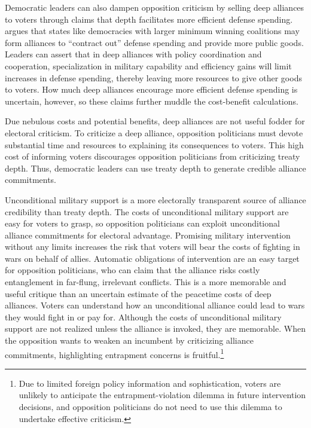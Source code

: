 \documentclass[12pt]{article}
\begin{document}
Democratic leaders can also dampen opposition criticism by selling deep alliances to voters through claims that depth facilitates more efficient defense spending. 
\citet{Kimball2010} argues that states like democracies with larger minimum winning coalitions may form alliances to ``contract out'' defense spending and provide more public goods. 
Leaders can assert that in deep alliances with policy coordination and cooperation, specialization in military capability and efficiency gains will limit increases in defense spending, thereby leaving more resources to give other goods to voters.  
How much deep alliances encourage more efficient defense spending is uncertain, however, so these claims further muddle the cost-benefit calculations. 


Due nebulous costs and potential benefits, deep alliances are not useful fodder for electoral criticism.
To criticize a deep alliance, opposition politicians must devote substantial time and resources to explaining its consequences to voters.  
This high cost of informing voters discourages opposition politicians from criticizing treaty depth. 
Thus, democratic leaders can use treaty depth to generate credible alliance commitments. 


Unconditional military support is a more electorally transparent source of alliance credibility than treaty depth. 
The costs of unconditional military support are easy for voters to grasp, so opposition politicians can exploit unconditional alliance commitments for electoral advantage. 
Promising military intervention without any limits increases the risk that voters will bear the costs of fighting in wars on behalf of allies. 
Automatic obligations of intervention are an easy target for opposition politicians, who can claim that the alliance risks costly entanglement in far-flung, irrelevant conflicts.  
This is a more memorable and useful critique than an uncertain estimate of the peacetime costs of deep alliances. 
Voters can understand how an unconditional alliance could lead to wars they would fight in or pay for. 
Although the costs of unconditional military support are not realized unless the alliance is invoked, they are memorable.
When the opposition wants to weaken an incumbent by criticizing alliance commitments, highlighting entrapment concerns is fruitful.\footnote{Due to limited foreign policy information and sophistication, voters are unlikely to anticipate the entrapment-violation dilemma in future intervention decisions, and opposition politicians do not need to use this dilemma to undertake effective criticism.} 
\end{document}
